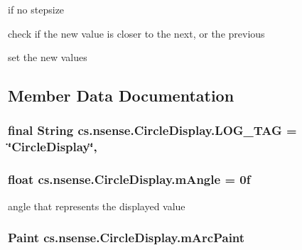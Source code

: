 if no stepsize

check if the new value is closer to the next, or the previous

set the new values 

\subsection{Member Data Documentation}
\hypertarget{classcs_1_1nsense_1_1_circle_display_aac227ce27ca731920766d70a5e0e1d08}{
\subsubsection[{L\-O\-G\-\_\-\-T\-A\-G}]{\setlength{\rightskip}{0pt plus 5cm}final String cs.\-nsense.\-Circle\-Display.\-L\-O\-G\-\_\-\-T\-A\-G = \char`\"{}Circle\-Display\char`\"{}\hspace{0.3cm}{\ttfamily [static]}, {\ttfamily [private]}}}\label{classcs_1_1nsense_1_1_circle_display_aac227ce27ca731920766d70a5e0e1d08}
\hypertarget{classcs_1_1nsense_1_1_circle_display_a314374d5fec0880ef39aedeaa926f837}{
\subsubsection[{m\-Angle}]{\setlength{\rightskip}{0pt plus 5cm}float cs.\-nsense.\-Circle\-Display.\-m\-Angle = 0f\hspace{0.3cm}{\ttfamily [private]}}}\label{classcs_1_1nsense_1_1_circle_display_a314374d5fec0880ef39aedeaa926f837}
angle that represents the displayed value \hypertarget{classcs_1_1nsense_1_1_circle_display_add14b4dbd5523db5c3f567bfe6ab0e33}{
\subsubsection[{m\-Arc\-Paint}]{\setlength{\rightskip}{0pt plus 5cm}Paint cs.\-nsense.\-Circle\-Display.\-m\-Arc\-Paint\hspace{0.3cm}{\ttfamily [private]}}}\label{classcs_1_1nsense_1_1_circle_display_add14b4dbd5523db5c3f567bfe6ab0e33}
